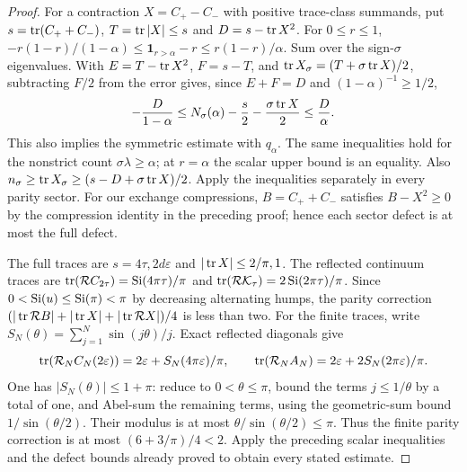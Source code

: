 \begin{proof}
For a contraction $X=C_+-C_-$ with positive trace-class summands, put
$s=\operatorname{tr}(C_++C_-)$, $T=\operatorname{tr}|X|\le s$ and $D=s-\operatorname{tr} X^2$.
For $0\le r\le1$,
$-r(1-r)/(1-\alpha)\le\mathbf1_{r>\alpha}-r\le r(1-r)/\alpha$.
Sum over the sign-$\sigma$ eigenvalues. With $E=T-\operatorname{tr} X^2$,
$F=s-T$, and $\operatorname{tr} X_\sigma=(T+\sigma\operatorname{tr} X)/2$, subtracting $F/2$
from the error gives, since $E+F=D$ and $(1-\alpha)^{-1}\ge1/2$,
\begin{equation}\label{unified:eq:asymmetric-count}
 -\frac D{1-\alpha}\le N_\sigma(\alpha)-\frac s2-\frac{\sigma\operatorname{tr} X}2
                    \le\frac D\alpha.
\end{equation}
This also implies the symmetric estimate with $q_\alpha$.
The same inequalities hold for the nonstrict count $\sigma\lambda\ge\alpha$;
at $r=\alpha$ the scalar upper bound is an equality.
Also $n_\sigma\ge\operatorname{tr} X_\sigma\ge(s-D+\sigma\operatorname{tr} X)/2$.
Apply the inequalities separately in every parity sector. For our
exchange compressions, $B=C_++C_-$ satisfies $B-X^2\ge0$ by the
compression identity in the preceding proof; hence each sector defect
is at most the full defect.

The full traces are $s=4\tau,2d\varepsilon$ and
$|\operatorname{tr} X|\le2/\pi,1$. The reflected continuum traces are
$\operatorname{tr}(\mathcal R C_{2\tau})=\operatorname{Si}(4\pi\tau)/\pi$ and
$\operatorname{tr}(\mathcal R\mathcal K_\tau)=2\operatorname{Si}(2\pi\tau)/\pi$.
Since $0<\operatorname{Si}(u)\le\operatorname{Si}(\pi)<\pi$ by decreasing alternating humps,
the parity correction $(|\operatorname{tr}\mathcal RB|+|\operatorname{tr} X|+
|\operatorname{tr}\mathcal RX|)/4$ is less than two.
For the finite traces, write $S_N(\theta)=\sum_{j=1}^N\sin(j\theta)/j$.
Exact reflected diagonals give
\[
 \operatorname{tr}(\mathcal R_NC_N(2\varepsilon))=2\varepsilon+
       S_N(4\pi\varepsilon)/\pi,\qquad
 \operatorname{tr}(\mathcal R_NA_N)=2\varepsilon+2S_N(2\pi\varepsilon)/\pi.
\]
One has $|S_N(\theta)|\le1+\pi$: reduce to $0<\theta\le\pi$,
bound the terms $j\le1/\theta$ by a total of one, and Abel-sum the
remaining terms, using the geometric-sum bound $1/\sin(\theta/2)$.
Their modulus is at most $\theta/\sin(\theta/2)\le\pi$.
Thus the finite parity correction is at most
$(6+3/\pi)/4<2$. Apply the preceding scalar inequalities and the
defect bounds already proved to obtain every stated estimate.


\end{proof}
